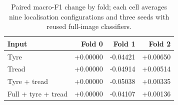 \begin{table}[t]
\caption{Paired macro-F1 change by fold; each cell averages nine localisation configurations and three seeds with reused full-image classifiers.}
\label{tab:fusion_folds}
\centering\small
\setlength{\tabcolsep}{3pt}
\begin{tabular}{lrrr}
\toprule
Input & Fold 0 & Fold 1 & Fold 2\\
\midrule
Tyre & +0.00000 & -0.04421 & +0.00650\\
Tread & +0.00000 & -0.04914 & +0.00514\\
Tyre + tread & +0.00000 & -0.05038 & +0.00335\\
Full + tyre + tread & +0.00000 & -0.04107 & +0.00136\\
\bottomrule
\end{tabular}
\end{table}
